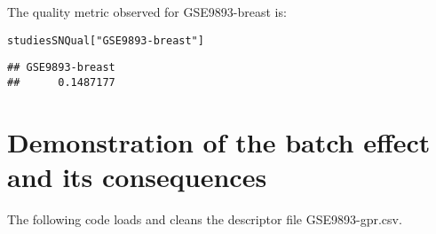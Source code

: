\documentclass{article}\usepackage[]{graphicx}\usepackage[]{color}
\makeatletter
\newcommand{\hlstr}[1]{\textcolor[rgb]{0.192,0.494,0.8}{#1}}%
\newcommand{\hlstd}[1]{\textcolor[rgb]{0.345,0.345,0.345}{#1}}%
\newenvironment{kframe}{%
 \def\at@end@of@kframe{}%
 \ifinner\ifhmode%
  \def\at@end@of@kframe{\end{minipage}}%
  \begin{minipage}{\columnwidth}%
 \fi\fi%
 \def\FrameCommand##1{\hskip\@totalleftmargin \hskip-\fboxsep
 \colorbox{shadecolor}{##1}\hskip-\fboxsep
     \hskip-\linewidth \hskip-\@totalleftmargin \hskip\columnwidth}%
 \MakeFramed {\advance\hsize-\width
   \@totalleftmargin\z@ \linewidth\hsize
   \@setminipage}}%
 {\par\unskip\endMakeFramed%
 \at@end@of@kframe}
\newenvironment{knitrout}{}{} %
\makeatother
\begin{document}
The quality metric observed for \textsf{GSE9893-breast} is:

\begin{knitrout}\small
{}\color{fgcolor}\begin{kframe}
\begin{alltt}
\hlstd{studiesSNQual[}\hlstr{"GSE9893-breast"}\hlstd{]}
\end{alltt}
\begin{verbatim}
## GSE9893-breast 
##      0.1487177
\end{verbatim}
\end{kframe}
\end{knitrout}

\section{Demonstration of the batch effect and its consequences}

The following code loads and cleans the descriptor file \textsf{GSE9893-gpr.csv}.
\end{document}
